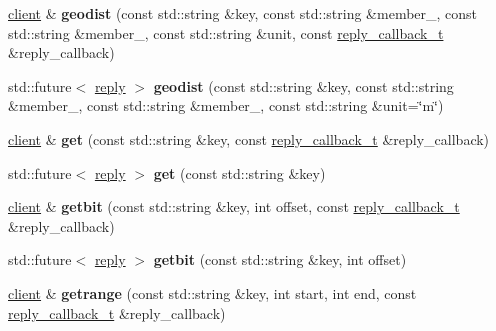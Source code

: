 \begin{DoxyCompactItemize}
\mbox{\label{classcpp__redis_1_1client_ade755123f2de81995df6a66a363a0dfb}} 
\hyperlink{classcpp__redis_1_1client}{client} \& {\bfseries geodist} (const std\+::string \&key, const std\+::string \&member\+\_, const std\+::string \&member\+\_, const std\+::string \&unit, const \hyperlink{classcpp__redis_1_1client_a061a1140d36d2eaeda82b09a0bb3f9f2}{reply\+\_\+callback\+\_\+t} \&reply\+\_\+callback)
\item 
\mbox{\label{classcpp__redis_1_1client_a32c21dc5c2b8187c33e22e695c2f1555}} 
std\+::future$<$ \hyperlink{classcpp__redis_1_1reply}{reply} $>$ {\bfseries geodist} (const std\+::string \&key, const std\+::string \&member\+\_, const std\+::string \&member\+\_, const std\+::string \&unit=\char`\"{}m\char`\"{})
\item 
\mbox{\label{classcpp__redis_1_1client_a1521d8c4c751d970c446aae7ccf8cc35}} 
\hyperlink{classcpp__redis_1_1client}{client} \& {\bfseries get} (const std\+::string \&key, const \hyperlink{classcpp__redis_1_1client_a061a1140d36d2eaeda82b09a0bb3f9f2}{reply\+\_\+callback\+\_\+t} \&reply\+\_\+callback)
\item 
\mbox{\label{classcpp__redis_1_1client_af2f987e43e139b21df2138a541b766f8}} 
std\+::future$<$ \hyperlink{classcpp__redis_1_1reply}{reply} $>$ {\bfseries get} (const std\+::string \&key)
\item 
\mbox{\label{classcpp__redis_1_1client_ad57b10f052814a2a15d4687e34d2be72}} 
\hyperlink{classcpp__redis_1_1client}{client} \& {\bfseries getbit} (const std\+::string \&key, int offset, const \hyperlink{classcpp__redis_1_1client_a061a1140d36d2eaeda82b09a0bb3f9f2}{reply\+\_\+callback\+\_\+t} \&reply\+\_\+callback)
\item 
\mbox{\label{classcpp__redis_1_1client_a43caae473008353b5ddc74a8fb36298c}} 
std\+::future$<$ \hyperlink{classcpp__redis_1_1reply}{reply} $>$ {\bfseries getbit} (const std\+::string \&key, int offset)
\item 
\mbox{\label{classcpp__redis_1_1client_a28b3fe6983918c6fc5549f1310742df1}} 
\hyperlink{classcpp__redis_1_1client}{client} \& {\bfseries getrange} (const std\+::string \&key, int start, int end, const \hyperlink{classcpp__redis_1_1client_a061a1140d36d2eaeda82b09a0bb3f9f2}{reply\+\_\+callback\+\_\+t} \&reply\+\_\+callback)

\end{DoxyCompactItemize}
